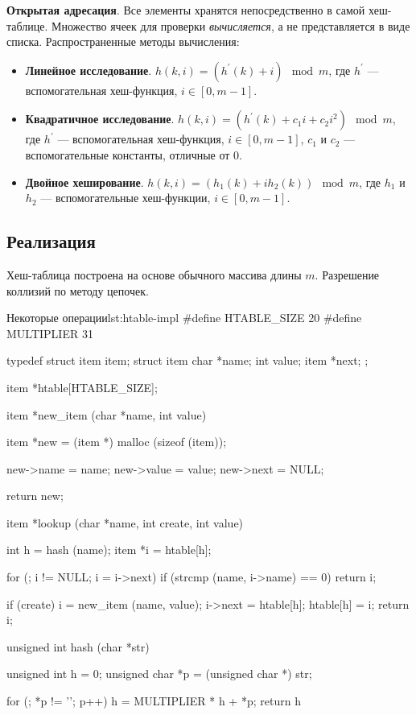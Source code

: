 \textbf{Открытая адресация}. Все элементы хранятся непосредственно в самой хеш-таблице. Множество ячеек для проверки \emph{вычисляется}, а не представляется в виде списка. Распространенные методы вычисления:
\begin{itemize}
  \item \textbf{Линейное исследование}. $h(k, i) = (h^{'}(k) + i) \mod m$, где $h^{'}$ --- вспомогательная хеш-функция, $i \in [0, m -1 ]$.
  \item \textbf{Квадратичное исследование}. $h(k, i) = (h^{'}(k) + c_1i + c_2i^2) \mod m$, где $h^{'}$ --- вспомогательная хеш-функция, $i \in [0, m -1 ]$, $c_1$ и $c_2$ --- вспомогательные константы, отличные от $0$.
  \item \textbf{Двойное хеширование}. $h(k, i) = (h_1(k) + ih_2(k)) \mod m$, где $h_1$ и $h_2$ --- вспомогательные хеш-функции, $i \in [0, m -1 ]$.
\end{itemize}

\subsection{Реализация}
Хеш-таблица построена на основе обычного массива длины $m$. Разрешение коллизий по методу цепочек.

\begin{clst}{Некоторые операции}{lst:htable-impl}
#define HTABLE_SIZE 20
#define MULTIPLIER  31

typedef struct item item;
struct item {
  char *name;
  int value;
  item *next;
};

item *htable[HTABLE_SIZE];

item *new_item (char *name, int value) {
  item *new = (item *) malloc (sizeof (item));

  new->name = name;
  new->value = value;
  new->next = NULL;

  return new;
}

item *lookup (char *name, int create, int value) {
  int h = hash (name);
  item *i = htable[h];

  for (; i != NULL; i = i->next)
    if (strcmp (name, i->name) == 0)
      return i;

  if (create) {
    i = new_item (name, value);
    i->next = htable[h];
    htable[h] = i;
  }
  return i;
}

unsigned int hash (char *str) {
  unsigned int h = 0;
  unsigned char *p = (unsigned char *) str;

  for (; *p != '\0'; p++)
    h = MULTIPLIER * h + *p;
  return h %
}
\end{clst}


